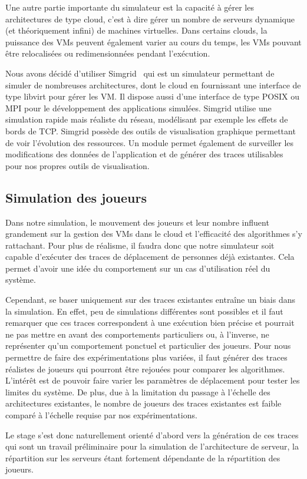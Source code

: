 Une autre partie importante du simulateur est la capacité à gérer les architectures de type cloud, c'est à dire gérer un nombre de serveurs dynamique (et théoriquement infini) de machines virtuelles.
Dans certains clouds, la puissance des VMs peuvent également varier au cours du temps, les VMs pouvant être relocalisées ou redimensionnées pendant l'exécution.

Nous avons décidé d'utiliser Simgrid~\cite{simgrid} qui est un simulateur permettant de simuler de nombreuses architectures, dont le cloud en fournissant une interface de type libvirt pour gérer les VM.
Il dispose aussi d'une interface de type POSIX ou MPI pour le développement des applications simulées.
Simgrid utilise une simulation rapide mais réaliste du réseau, modélisant par exemple les effets de bords de TCP.
Simgrid possède des outils de visualisation graphique permettant de voir l'évolution des ressources.
Un module permet également de surveiller les modifications des données de l'application et de générer des traces utilisables pour nos propres outils de visualisation.

\subsection{Simulation des joueurs}
Dans notre simulation, le mouvement des joueurs et leur nombre influent grandement sur la gestion des VMs dans le cloud et l'efficacité des algorithmes s'y rattachant.
Pour plus de réalisme, il faudra donc que notre simulateur soit capable d'exécuter des traces de déplacement de personnes déjà existantes.
Cela permet d'avoir une idée du comportement sur un cas d'utilisation réel du système.

Cependant, se baser uniquement sur des traces existantes entraîne un biais dans la simulation.
En effet, peu de simulations différentes sont possibles et il faut remarquer que ces traces correspondent à une exécution bien précise et pourrait ne pas mettre en avant des comportements particuliers ou, à l'inverse, ne représenter qu'un comportement ponctuel et particulier des joueurs.
Pour nous permettre de faire des expérimentations plus variées, il faut générer des traces réalistes de joueurs qui pourront être rejouées pour comparer les algorithmes.
L'intérêt est de pouvoir faire varier les paramètres de déplacement pour tester les limites du système.
De plus, due à la limitation du passage à l'échelle des architectures existantes, le nombre de joueurs des traces existantes est faible comparé à l'échelle requise par nos expérimentations.

Le stage s'est donc naturellement orienté d'abord vers la génération de ces traces qui sont un travail préliminaire pour la simulation de l'architecture de serveur, la répartition sur les serveurs étant fortement dépendante de la répartition des joueurs.

